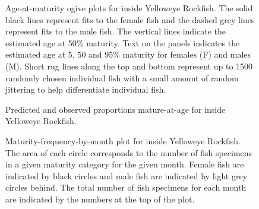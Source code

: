\documentclass[11pt]{book}
\begin{document}
\begin{figure}[htb]

{\centering {} 

}

\caption{Age-at-maturity ogive plots for inside Yelloweye Rockfish. The solid black lines represent fits to the female fish and the dashed grey lines represent fits to the male fish. The vertical lines indicate the estimated age at 50\% maturity. Text on the panels indicates the estimated age at 5, 50 and 95\% maturity for females (F) and males (M). Short rug lines along the top and bottom represent up to 1500 randomly chosen individual fish with a small amount of random jittering to help differentiate individual fish.}\label{fig:percent-maturity}
\end{figure}

\begin{figure}[htb]

{\centering {} 

}

\caption{Predicted and observed proportions mature-at-age for inside Yelloweye Rockfish.}\label{fig:prop-mature}
\end{figure}

\begin{figure}[htb]

{\centering {} 

}

\caption{Maturity-frequency-by-month plot for inside Yelloweye Rockfish. The area of each circle corresponds to the number of fish specimens in a given maturity category for the given month. Female fish are indicated by black circles and male fish are indicated by light grey circles behind. The total number of fish specimens for each month are indicated by the numbers at the top of the plot.}\label{fig:mat-months}
\end{figure}
\clearpage
\end{document}
